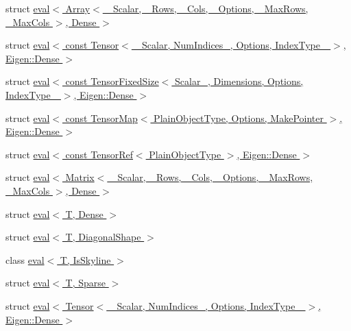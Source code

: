 \begin{DoxyCompactItemize}
\item 
struct \hyperlink{struct_eigen_1_1internal_1_1eval_3_01_array_3_01___scalar_00_01___rows_00_01___cols_00_01___optifb38e4e42f3aa82ee965fe5a912f110a}{eval$<$ Array$<$ \+\_\+\+Scalar, \+\_\+\+Rows, \+\_\+\+Cols, \+\_\+\+Options, \+\_\+\+Max\+Rows, \+\_\+\+Max\+Cols $>$, Dense $>$}
\item 
struct \hyperlink{struct_eigen_1_1internal_1_1eval_3_01const_01_tensor_3_01___scalar_00_01_num_indices___00_01_optc9dc50531ff0dd75e0889d13c2eb933e}{eval$<$ const Tensor$<$ \+\_\+\+Scalar, Num\+Indices\+\_\+, Options, Index\+Type\+\_\+ $>$, Eigen\+::\+Dense $>$}
\item 
struct \hyperlink{struct_eigen_1_1internal_1_1eval_3_01const_01_tensor_fixed_size_3_01_scalar___00_01_dimensions_0f43ed21765264e2b54d64ee38264752a}{eval$<$ const Tensor\+Fixed\+Size$<$ Scalar\+\_\+, Dimensions, Options, Index\+Type\+\_\+ $>$, Eigen\+::\+Dense $>$}
\item 
struct \hyperlink{struct_eigen_1_1internal_1_1eval_3_01const_01_tensor_map_3_01_plain_object_type_00_01_options_00f2ed4b30308fb6eaa0741d03c8445225}{eval$<$ const Tensor\+Map$<$ Plain\+Object\+Type, Options, Make\+Pointer $>$, Eigen\+::\+Dense $>$}
\item 
struct \hyperlink{struct_eigen_1_1internal_1_1eval_3_01const_01_tensor_ref_3_01_plain_object_type_01_4_00_01_eigen_1_1_dense_01_4}{eval$<$ const Tensor\+Ref$<$ Plain\+Object\+Type $>$, Eigen\+::\+Dense $>$}
\item 
struct \hyperlink{struct_eigen_1_1internal_1_1eval_3_01_matrix_3_01___scalar_00_01___rows_00_01___cols_00_01___opt9cfa1a2b5d36a2fa1d70e324e0b1c472}{eval$<$ Matrix$<$ \+\_\+\+Scalar, \+\_\+\+Rows, \+\_\+\+Cols, \+\_\+\+Options, \+\_\+\+Max\+Rows, \+\_\+\+Max\+Cols $>$, Dense $>$}
\item 
struct \hyperlink{struct_eigen_1_1internal_1_1eval_3_01_t_00_01_dense_01_4}{eval$<$ T, Dense $>$}
\item 
struct \hyperlink{struct_eigen_1_1internal_1_1eval_3_01_t_00_01_diagonal_shape_01_4}{eval$<$ T, Diagonal\+Shape $>$}
\item 
class \hyperlink{class_eigen_1_1internal_1_1eval_3_01_t_00_01_is_skyline_01_4}{eval$<$ T, Is\+Skyline $>$}
\item 
struct \hyperlink{struct_eigen_1_1internal_1_1eval_3_01_t_00_01_sparse_01_4}{eval$<$ T, Sparse $>$}
\item 
struct \hyperlink{struct_eigen_1_1internal_1_1eval_3_01_tensor_3_01___scalar_00_01_num_indices___00_01_options_00_e6e8e1d1010612a3ca2530d1fede28ca}{eval$<$ Tensor$<$ \+\_\+\+Scalar, Num\+Indices\+\_\+, Options, Index\+Type\+\_\+ $>$, Eigen\+::\+Dense $>$}

\end{DoxyCompactItemize}
